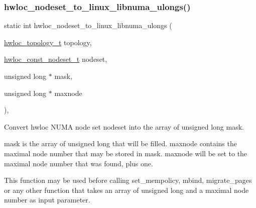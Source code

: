 \subsubsection{\texorpdfstring{hwloc\+\_\+nodeset\+\_\+to\+\_\+linux\+\_\+libnuma\+\_\+ulongs()}{hwloc\_nodeset\_to\_linux\_libnuma\_ulongs()}}
{\footnotesize\ttfamily static int hwloc\+\_\+nodeset\+\_\+to\+\_\+linux\+\_\+libnuma\+\_\+ulongs (\begin{DoxyParamCaption}\item[{\hyperlink{a00186_ga9d1e76ee15a7dee158b786c30b6a6e38}{hwloc\+\_\+topology\+\_\+t}}]{topology,  }\item[{\hyperlink{a00183_ga2f5276235841ad66a79bedad16a5a10c}{hwloc\+\_\+const\+\_\+nodeset\+\_\+t}}]{nodeset,  }\item[{unsigned long $\ast$}]{mask,  }\item[{unsigned long $\ast$}]{maxnode }\end{DoxyParamCaption})\hspace{0.3cm}{\ttfamily [inline]}, {\ttfamily [static]}}



Convert hwloc N\+U\+MA node set {\ttfamily nodeset} into the array of unsigned long {\ttfamily mask}. 

{\ttfamily mask} is the array of unsigned long that will be filled. {\ttfamily maxnode} contains the maximal node number that may be stored in {\ttfamily mask}. {\ttfamily maxnode} will be set to the maximal node number that was found, plus one.

This function may be used before calling set\+\_\+mempolicy, mbind, migrate\+\_\+pages or any other function that takes an array of unsigned long and a maximal node number as input parameter. 
